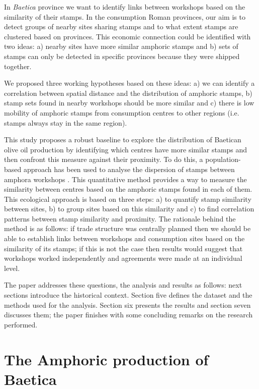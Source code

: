 In \textit{Baetica} province we want to identify links between workshops based on the similarity of their stamps. In the consumption Roman provinces, our aim is to detect groups of nearby sites sharing stamps and to what extent stamps are clustered based on provinces. This economic connection could be identified with two ideas: a) nearby sites have more similar amphoric stamps and b) sets of stamps can only be detected in specific provinces because they were shipped together.

We proposed three working hypotheses based on these ideas: a) we can identify a correlation between spatial distance and the distribution of amphoric stamps, b) stamp sets found in nearby workshops should be more similar and c) there is low mobility of amphoric stamps from consumption centres to other regions (i.e. stamps always stay in the same region).

This study proposes a robust baseline to explore the distribution of Baetican olive oil production by identifying which centres have more similar stamps and then confront this measure against their proximity. To do this, a population-based approach has been used to analyse the dispersion of stamps between amphora workshops \citep{rubio-campillo_ecology_2018}. This quantitative method provides a way to measure the similarity between centres based on the amphoric stamps found in each of them. This ecological approach is based on three steps: a) to quantify stamp similarity between sites, b) to group sites based on this similarity and c) to find correlation patterns between stamp similarity and proximity. The rationale behind the method is as follows: if trade structure was centrally planned then we should be able to establish links between workshops and consumption sites based on the similarity of its stamps; if this is not the case then results would suggest that workshops worked independently and agreements were made at an individual level.

The paper addresses these questions, the analysis and results as follows: next sections introduce the historical context. Section five defines the dataset and the methods used for the analysis. Section six presents the results and section seven discusses them; the paper finishes with some concluding remarks on the research performed.


\section{The Amphoric production of Baetica}
\label{sec:1}

